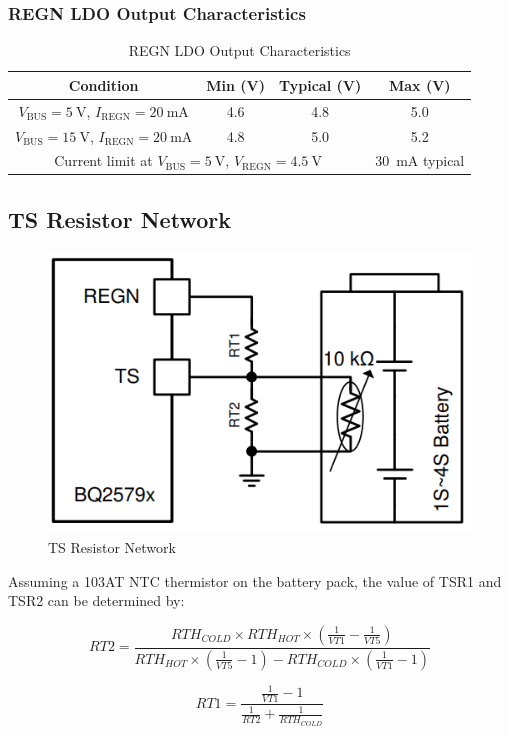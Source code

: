 \documentclass[12pt]{article}
\begin{document}
\subsubsection{REGN LDO Output Characteristics}
\begin{table}[H]
    \centering
    \begin{tabular}{|c|c|c|c|}
        \hline
        \rowcolor{headerbg}
        \textcolor{headerfg}{\textbf{Condition}} &
        \textcolor{headerfg}{\textbf{Min (V)}} &
        \textcolor{headerfg}{\textbf{Typical (V)}} &
        \textcolor{headerfg}{\textbf{Max (V)}} \\
        \hline
        $V_{\text{BUS}} = \SI{5}{\volt}$, $I_{\text{REGN}} = \SI{20}{\milli\ampere}$ &
        4.6 & 4.8 & 5.0 \\
        $V_{\text{BUS}} = \SI{15}{\volt}$, $I_{\text{REGN}} = \SI{20}{\milli\ampere}$ &
        4.8 & 5.0 & 5.2 \\
        \hline
        \multicolumn{3}{|c|}{Current limit at $V_{\text{BUS}} = \SI{5}{\volt}$, $V_{\text{REGN}} = \SI{4.5}{\volt}$} &
        \SI{30}{\milli\ampere} typical \\
        \hline
    \end{tabular}
    \caption{REGN LDO Output Characteristics}
    \label{tab:REGN-LDO-Output}
\end{table}

\subsection{TS Resistor Network}
\begin{figure}[H]
    \centering
    \includegraphics[width=.5\linewidth]{bq25798 TS Resistor Network.PNG}
    \caption{TS Resistor Network}
    \label{img:bq25798-TS Resistor Network}
\end{figure}

Assuming a 103AT NTC thermistor on the battery pack, the value of TSR1 and TSR2 can be determined by:
\newpage

\begingroup
\large
\begin{equation}
RT2 = \frac{RTH_{COLD} \times RTH_{HOT} \times \left( \frac{1}{VT1} - \frac{1}{VT5} \right)}{RTH_{HOT} \times \left( \frac{1}{VT5} - 1 \right) - RTH_{COLD} \times \left( \frac{1}{VT1} - 1 \right)}
\label{equ:RT2_value}
\end{equation}
\newline

\begin{equation}
RT1 = \frac{\frac{1}{VT1} - 1}{\frac{1}{RT2} + \frac{1}{RTH_{COLD}}}
\label{equ:RT1_value}
\end{equation}
\endgroup
\end{document}
